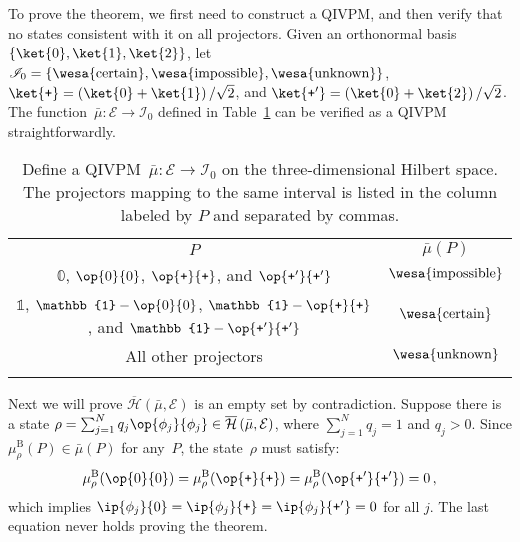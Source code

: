 \documentclass[english,reprint, aps, prl,superscriptaddress, showpacs,
showkeys, longbibliography, amsmath, amssymb, floatfix]{revtex4-1}
\theoremstyle{plain}
\theoremstyle{definition}
\newcommand{\Hilb}{\mathcal{H}}
\newcommand{\events}{\ensuremath{\mathcal{E}}}
\newcommand{\imposs}{{\text{\wesa{impossible}}}}
\newcommand{\necess}{{\text{\wesa{certain}}}}
\newcommand{\unknown}{{\text{\wesa{unknown}}}}
\newcommand{\proj}[1]{\op{#1}{#1}}
\newcommand{\ps}{\texttt{+}}
\newcommand{\coreBorn}{\ensuremath{\overline{\Hilb}}}
\begin{document}
\noindent To prove the theorem, we first need to construct a QIVPM,
and then verify that no states consistent with it on all projectors.
Given an orthonormal basis $\left\{ \ket{0},\ket{1},\ket{2}\right\} $,
let $\mathscr{I}_{0}=\left\{ \necess,\imposs,\unknown\right\} $,
$\ket{\ps}=\left(\ket{0}+\ket{1}\right)/\sqrt{2}$, and $\ket{\ps'}=\left(\ket{0}+\ket{2}\right)/\sqrt{2}$.
The function~$\bar{\mu}:\events\rightarrow\mathscr{I}_{0}$ defined
in Table~\ref{tab:non-Born-QIVPM} can be verified as a QIVPM straightforwardly.
\begin{table}
\caption{\label{tab:non-Born-QIVPM}Define a QIVPM~$\bar{\mu}:\events\rightarrow\mathscr{I}_{0}$
on the three-dimensional Hilbert space. The projectors mapping to
the same interval is listed in the column labeled by $P$ and separated
by commas.}

\begin{tabular}{cc}
\toprule 
\addlinespace
$P$ & $\bar{\mu}\left(P\right)$\tabularnewline\addlinespace
\midrule
\midrule 
\addlinespace
$\mathbb{0}$, $\proj{0}$, $\proj{\ps}$, and $\proj{\ps'}$ & $\imposs$\tabularnewline\addlinespace
\midrule 
\addlinespace
$\mathbb{1}$, $\mathbb{1}-\proj{0}$, $\mathbb{1}-\proj{\ps}$, and
$\mathbb{1}-\proj{\ps'}$ & $\necess$\tabularnewline\addlinespace
\midrule 
\addlinespace
All other projectors & $\unknown$\tabularnewline\addlinespace
\bottomrule
\end{tabular}
\end{table}
Next we will prove $\coreBorn\left(\bar{\mu},\events\right)$ is an
empty set by contradiction. Suppose there is a state $\rho=\sum_{j=1}^{N}q_{j}\proj{\phi_{j}}\in\coreBorn\left(\bar{\mu},\events\right)$,
where $\sum_{j=1}^{N}q_{j}=1$ and $q_{j}>0$. Since $\mu_{\rho}^{\mathrm{B}}(P)\in\bar{\mu}(P)$
for any~$P$, the state~$\rho$ must satisfy: 
\begin{equation}
\mu_{\rho}^{\mathrm{B}}(\proj{0})=\mu_{\rho}^{\mathrm{B}}(\proj{\ps})=\mu_{\rho}^{\mathrm{B}}(\proj{\ps'})=0\,,
\end{equation}
which implies $\ip{\phi_{j}}{0}=\ip{\phi_{j}}{\ps}=\ip{\phi_{j}}{\ps'}=0$
for all $j$. The last equation never holds proving the theorem.
\end{document}
